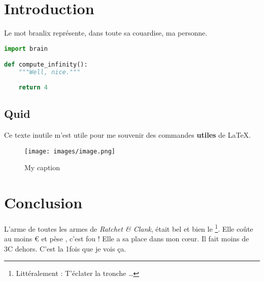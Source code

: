 
\section{Introduction}

Le mot \og branlix \fg représente, dans toute sa couardise, ma personne.

\begin{lstlisting}[language=python]
import brain

def compute_infinity():
    """Well, nice."""
    
    return 4
\end{lstlisting}

\subsection{Quid}

Ce texte inutile m'est utile pour me souvenir des commandes \textbf{utiles} de \LaTeX.

\begin{figure}[h]
    \centering
    \texttt{[image: images/image.png]}
    \caption{My caption}
    \label{fig:my_label}
\end{figure}

\section{Conclusion}

L'arme  de toutes les armes de \textit{Ratchet \& Clank}, était bel et bien le \footnote{Littéralement : \og T'éclater la tronche \fg \dots}. Elle coûte au moins  \euro{} et pèse , c'est fou ! Elle a sa place dans mon c\oe ur. Il fait moins de 3\degres C dehors. C'est la 1\iere fois que je vois ça.
